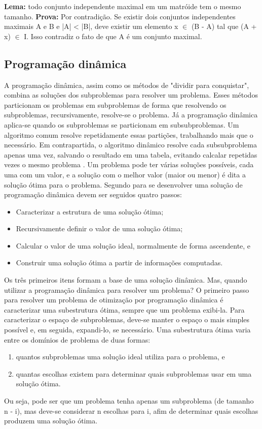 \textbf{Lema:} todo conjunto independente maximal em um matróide tem o mesmo tamanho. 
\textbf{Prova:}  Por contradição. Se existir dois conjuntos independentes maximais A e B e |A| < |B|, deve existir um elemento x $\in$ (B - A) tal que (A + x) $\in$ I. Isso contradiz o fato de que A é um conjunto maximal.

\subsection{Programação dinâmica} \label{Programação dinâmica}
A programação dinâmica, assim como os métodos de "dividir para conquistar", combina as soluções dos subproblemas para resolver um problema. Esses métodos particionam os problemas em subproblemas de forma que resolvendo os subproblemas, recursivamente, resolve-se o problema. Já a programação dinâmica aplica-se quando os subproblemas se particionam em subsubproblemas. Um algoritmo comum resolve repetidamente essas partições, trabalhando mais que o necessário. Em contrapartida, o algoritmo dinâmico resolve cada subsubproblema apenas uma vez, salvando o resultado em uma tabela, evitando calcalar repetidas vezes o mesmo problema \cite{cormen2009introduction}.
Um problema pode ter várias soluções possíveis, cada uma com um valor, e a solução com o melhor valor (maior ou menor) é dita a solução ótima para o problema.
Segundo \cite{cormen2009introduction} para se desenvolver uma solução de programação dinâmica devem ser seguidos quatro passos:
\begin{itemize}
\item Caracterizar a estrutura de uma solução ótima;
\item Recursivamente definir o valor de uma solução ótima;
\item Calcular o valor de uma solução ideal, normalmente de forma ascendente, e
\item Construir uma solução ótima a partir de informações computadas. 
\end{itemize}
Os três primeiros itens formam a base de uma solução dinâmica. Mas, quando utilizar a programação dinâmica para resolver um problema? O primeiro passo para resolver um problema de otimização por programação dinâmica é caracterizar uma subestrutura ótima, sempre que um problema exibi-la. 
Para caracterizar o espaço de subproblemas, deve-se manter o espaço o mais simples possível e, em seguida, expandi-lo, se necessário. Uma subestrutura ótima varia entre os domínios de problema de duas formas:
\begin{enumerate}[label=(\roman*)]
\item quantos subproblemas uma solução ideal utiliza para o problema, e
\item quantas escolhas existem para determinar quais subproblemas usar em uma solução ótima.
\end{enumerate}
Ou seja, pode ser que um problema tenha apenas um subproblema (de tamanho n - i), mas deve-se considerar n escolhas para i, afim de determinar quais escolhas produzem uma solução ótima.

